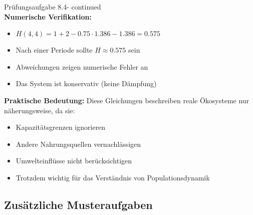 \begin{example2}{Prüfungsaufgabe 8.4- continued}\\
\textbf{Numerische Verifikation:}
\begin{itemize}
    \item $H(4,4) = 1 + 2 - 0.75 \cdot 1.386 - 1.386 = 0.575$
    \item Nach einer Periode sollte $H \approx 0.575$ sein
    \item Abweichungen zeigen numerische Fehler an
    \item Das System ist konservativ (keine Dämpfung)
\end{itemize}

\textbf{Praktische Bedeutung:}
Diese Gleichungen beschreiben reale Ökosysteme nur näherungsweise, da sie:
\begin{itemize}
    \item Kapazitätsgrenzen ignorieren
    \item Andere Nahrungsquellen vernachlässigen
    \item Umwelteinflüsse nicht berücksichtigen
    \item Trotzdem wichtig für das Verständnis von Populationsdynamik
\end{itemize}
\end{example2}

\subsection{Zusätzliche Musteraufgaben}

